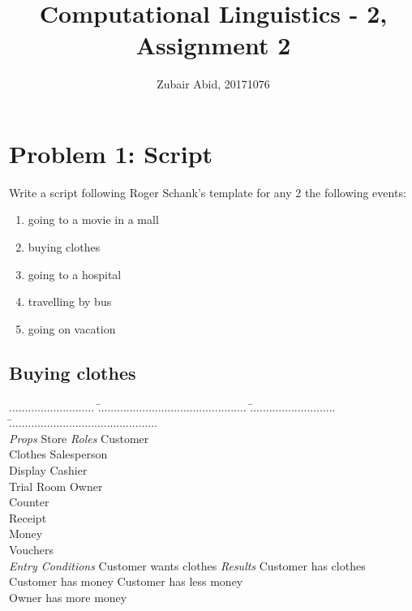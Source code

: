 \documentclass[11pt,a4paper]{article}
\title{Computational Linguistics - 2, Assignment 2}
\author{Zubair Abid, 20171076}
\begin{document}
	\maketitle
	
	\section{Problem 1: Script}
	Write a script following Roger Schank's template for any 2 the following events:\\
	\begin{enumerate}
		\item going to a movie in a mall
		\item buying clothes
		\item going to a hospital
		\item travelling by bus
		\item going on vacation
	\end{enumerate}
	
	\subsection{Buying clothes}
	\begin{tabbing}
	........................... \= ............................................... 
	\= ........................... \= ............................................... \\
	\textit{Props} \> Store \> \textit{Roles} \> Customer \\
				\> Clothes	\> 				\> Salesperson \\
				\> Display	\>				\> Cashier \\
				\> Trial Room	\>			\> Owner \\
				\> Counter	\>				\>	\\
				\> Receipt	\>				\>	\\
				\> Money	\>				\>	\\
				\> Vouchers	\>				\>	\\
	\textit{Entry Conditions} \> Customer wants clothes \> 
	\textit{Results} \>	Customer has clothes\\
				\> Customer has money	\>	\>	Customer has less money \\
				\>	\>						\> Owner has more money \\	
	\end{tabbing}			
	
\end{document}
